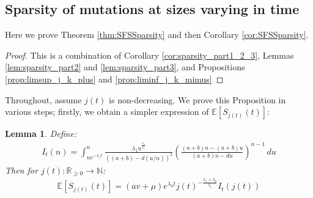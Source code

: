 \documentclass{article}
\numberwithin{equation}{section}
\newtheorem{lemma}{Lemma}
\begin{document}
\subsection{Sparsity of mutations at sizes varying in time}\label{app:SFSSparsity}
Here we prove Theorem \ref{thm:SFSSparsity} and then Corollary \ref{cor:SFSSparsity}.
\SFSSparsity*
\begin{proof}
  This is a combination of Corollary \ref{cor:sparsity_part1_2_3}, Lemmas \ref{lem:sparsity_part2} and \ref{lem:sparsity_part3}, and Propositions \ref{prop:limsup_j_k_plus} and \ref{prop:liminf_j_k_mimus}
\end{proof}
Throughout, assume $j(t)$ is non-decreasing. We prove this Proposition in various steps; firstly, we obtain a simpler expression of $\mathbb{E}[S_{j(t)}(t)]$:
\begin{lemma}\label{lem:changing_j_mean}
  Define:
  \begin{align}
      I_t(n)=\int_{ne^{-\lambda_1t}}^{n}\frac{\lambda_1u^{\frac{\lambda_0}{\lambda_1}}}{((a+b)-d(u/n))^2}\left(\frac{(a+b)n-(a+b)u}{(a+b)n-du}\right)^{n-1}\,du\label{eq:I_t_n_def}
  \end{align}
  Then for $j(t):\mathbb{R}_{\geq 0}\to\mathbb{N}$:
  \begin{align}
    \mathbb{E}[S_{j(t)}(t)]=(av+\mu)e^{\lambda_0 t}j(t)^{-\frac{\lambda_1+\lambda_0}{\lambda_1}}I_t(j(t))\label{eq:meanSFS_varying}
  \end{align}
\end{lemma}
\end{document}
